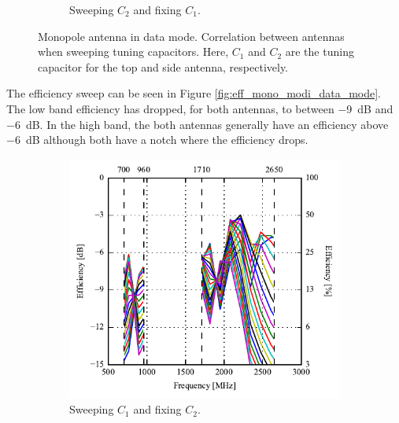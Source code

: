 \begin{figure}[htbp]
\begin{subfigure}{0.49\linewidth}
        \caption{Sweeping $C_2$ and fixing $C_1$.}
    \end{subfigure}
    \caption{Monopole antenna in data mode. Correlation between antennas when sweeping tuning capacitors. Here, $C_1$ and $C_2$ are the tuning capacitor for the top and side antenna, respectively.}
    \label{fig:corr_mono_modi_data_mode}
\end{figure}


The efficiency sweep can be seen in Figure \ref{fig:eff_mono_modi_data_mode}. The low band efficiency has dropped, for both antennas, to between \SI{-9}{dB} and \SI{-6}{dB}. In the high band, the both antennas generally have an efficiency above \SI{-6}{dB} although both have a notch where the efficiency drops.

\begin{figure}[htbp]
    \centering
    \begin{subfigure}{0.49\linewidth}
        \includegraphics{img/tech_sol/monopole/highband/ue/datamode/eff_top.pdf}
        \caption{Sweeping $C_1$ and fixing $C_2$.}
    \end{subfigure}
    \hfill
    \begin{subfigure}{0.49\linewidth}

\end{subfigure}
\end{figure}
